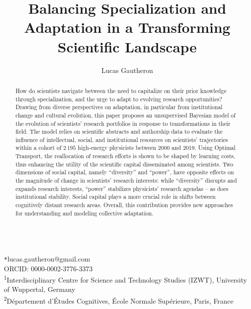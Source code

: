 \documentclass{article}
\title{Balancing Specialization and Adaptation in a Transforming Scientific Landscape}
\author{Lucas Gautheron\protect\affmark[1,2]}
\date{}
\newcommand*{\affaddr}[1]{#1}
\newcommand*{\affmark}[1][*]{\textsuperscript{#1}}
\newcommand*{\email}[1][*]{\texttt{#1}}
\begin{document}
\maketitle



\begin{abstract}
How do scientists navigate between the need to capitalize on their prior knowledge through specialization, and the urge to adapt to evolving research opportunities? Drawing from diverse perspectives on adaptation, in particular from institutional change and cultural evolution, this paper proposes an unsupervised Bayesian model of the evolution of scientists' research portfolios in response to transformations in their field. The model relies on scientific abstracts and authorship data to evaluate the influence of intellectual, social, and institutional resources on scientists' trajectories within a cohort of $2\,195$ high-energy physicists between 2000 and 2019. Using Optimal Transport, the reallocation of research efforts is shown to be shaped by learning costs, thus enhancing the utility of the scientific capital disseminated among scientists. Two dimensions of social capital, namely ``diversity'' and ``power'', have opposite effects on the magnitude of change in scientists' research interests: while ``diversity'' disrupts and expands research interests, ``power'' stabilizes physicists' research agendas -- as does institutional stability. Social capital plays a more crucial role in shifts between cognitively distant research areas. Overall, this contribution provides new approaches for understanding and modeling collective adaptation.  %
    
\end{abstract}


\ \\

  \email{lucas.gautheron@gmail.com}\\ORCID: 0000-0002-3776-3373\\
 \affaddr{\affmark[1]Interdisciplinary Centre for Science and Technology Studies (IZWT), University of Wuppertal, Germany}\\
 \affaddr{\affmark[2]Département d'Études Cognitives, École Normale Supérieure, Paris, France}
\end{document}
